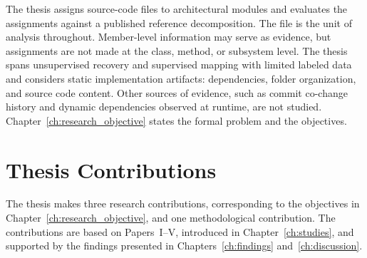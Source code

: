 The thesis assigns source-code files to architectural modules and evaluates the assignments against a published reference decomposition. The file is the unit of analysis throughout. Member-level information may serve as evidence, but assignments are not made at the class, method, or subsystem level. The thesis spans unsupervised recovery and supervised mapping with limited labeled data and considers static implementation artifacts: dependencies, folder organization, and source code content. Other sources of evidence, such as commit co-change history and dynamic dependencies observed at runtime, are not studied. Chapter~\ref{ch:research_objective} states the formal problem and the objectives.

\section{Thesis Contributions}
\label{sec:intro-contributions}

The thesis makes three research contributions, corresponding to the objectives in Chapter~\ref{ch:research_objective}, and one methodological contribution. The contributions are based on Papers~I--V, introduced in Chapter~\ref{ch:studies}, and supported by the findings presented in Chapters~\ref{ch:findings} and~\ref{ch:discussion}.

